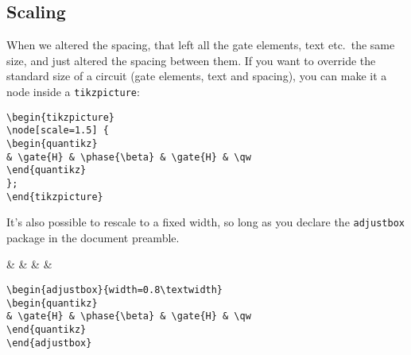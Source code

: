 \documentclass[aps,pra,10pt,nofootinbib]{revtex4}
\begin{document}

\subsection{Scaling}

When we altered the spacing, that left all the gate elements, text etc.\ the same size, and just altered the spacing between them. If you want to override the standard size of a circuit (gate elements, text and spacing), you can make it a node inside a \verb!tikzpicture!:
\begin{Code}
\begin{center}
\end{center}
\tcblower
\begin{lstlisting}
\begin{tikzpicture}
\node[scale=1.5] {
\begin{quantikz}
& \gate{H} & \phase{\beta} & \gate{H} & \qw
\end{quantikz}
};
\end{tikzpicture}
\end{lstlisting}
\end{Code}
It's also possible to rescale to a fixed width, so long as you declare the \verb!adjustbox! package in the document preamble.
\begin{Code}
\begin{center}
\begin{adjustbox}{width=0.8\textwidth}
\begin{quantikz}
&  & \phase{\beta} &  & \qw
\end{quantikz}
\end{adjustbox}
\end{center}
\tcblower
\begin{lstlisting}
\begin{adjustbox}{width=0.8\textwidth}
\begin{quantikz}
& \gate{H} & \phase{\beta} & \gate{H} & \qw
\end{quantikz}
\end{adjustbox}
\end{lstlisting}
\end{Code}
\end{document}
